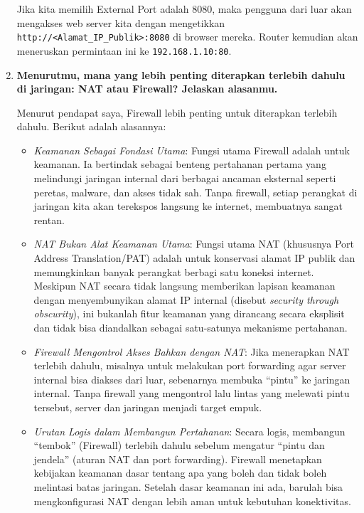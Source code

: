 \begin{enumerate}
    Jika kita memilih External Port adalah 8080, maka pengguna dari luar akan mengakses web server kita dengan mengetikkan \texttt{http://\textless{}Alamat\_IP\_Publik\textgreater{}:8080} di browser mereka. Router kemudian akan meneruskan permintaan ini ke \texttt{192.168.1.10:80}.
   
    \item \textbf{Menurutmu, mana yang lebih penting diterapkan terlebih dahulu di jaringan: NAT atau Firewall? Jelaskan alasanmu.}
    
    Menurut pendapat saya, Firewall lebih penting untuk diterapkan terlebih dahulu. Berikut adalah alasannya:
    \begin{itemize}
        \item \textit{Keamanan Sebagai Fondasi Utama}: Fungsi utama Firewall adalah untuk keamanan. Ia bertindak sebagai benteng pertahanan pertama yang melindungi jaringan internal dari berbagai ancaman eksternal seperti peretas, malware, dan akses tidak sah. Tanpa firewall, setiap perangkat di jaringan kita akan terekspos langsung ke internet, membuatnya sangat rentan.
        \item \textit{NAT Bukan Alat Keamanan Utama}: Fungsi utama NAT (khususnya Port Address Translation/PAT) adalah untuk konservasi alamat IP publik dan memungkinkan banyak perangkat berbagi satu koneksi internet. Meskipun NAT secara tidak langsung memberikan lapisan keamanan dengan menyembunyikan alamat IP internal (disebut \textit{security through obscurity}), ini bukanlah fitur keamanan yang dirancang secara eksplisit dan tidak bisa diandalkan sebagai satu-satunya mekanisme pertahanan.
        \item \textit{Firewall Mengontrol Akses Bahkan dengan NAT}: Jika menerapkan NAT terlebih dahulu, misalnya untuk melakukan port forwarding agar server internal bisa diakses dari luar, sebenarnya membuka ``pintu'' ke jaringan internal. Tanpa firewall yang mengontrol lalu lintas yang melewati pintu tersebut, server dan jaringan menjadi target empuk.
        \item \textit{Urutan Logis dalam Membangun Pertahanan}: Secara logis, membangun ``tembok'' (Firewall) terlebih dahulu sebelum mengatur ``pintu dan jendela'' (aturan NAT dan port forwarding). Firewall menetapkan kebijakan keamanan dasar tentang apa yang boleh dan tidak boleh melintasi batas jaringan. Setelah dasar keamanan ini ada, barulah bisa mengkonfigurasi NAT dengan lebih aman untuk kebutuhan konektivitas.
    \end{itemize}


\end{enumerate}
